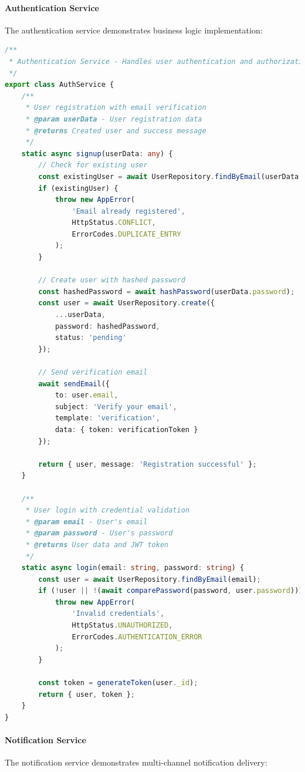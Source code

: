 \paragraph{Authentication Service}
The authentication service demonstrates business logic implementation:

\begin{lstlisting}[language=TypeScript, caption={Authentication Service Implementation}]
/**
 * Authentication Service - Handles user authentication and authorization
 */
export class AuthService {
    /**
     * User registration with email verification
     * @param userData - User registration data
     * @returns Created user and success message
     */
    static async signup(userData: any) {
        // Check for existing user
        const existingUser = await UserRepository.findByEmail(userData.email);
        if (existingUser) {
            throw new AppError(
                'Email already registered',
                HttpStatus.CONFLICT,
                ErrorCodes.DUPLICATE_ENTRY
            );
        }

        // Create user with hashed password
        const hashedPassword = await hashPassword(userData.password);
        const user = await UserRepository.create({
            ...userData,
            password: hashedPassword,
            status: 'pending'
        });

        // Send verification email
        await sendEmail({
            to: user.email,
            subject: 'Verify your email',
            template: 'verification',
            data: { token: verificationToken }
        });

        return { user, message: 'Registration successful' };
    }

    /**
     * User login with credential validation
     * @param email - User's email
     * @param password - User's password
     * @returns User data and JWT token
     */
    static async login(email: string, password: string) {
        const user = await UserRepository.findByEmail(email);
        if (!user || !(await comparePassword(password, user.password))) {
            throw new AppError(
                'Invalid credentials',
                HttpStatus.UNAUTHORIZED,
                ErrorCodes.AUTHENTICATION_ERROR
            );
        }

        const token = generateToken(user._id);
        return { user, token };
    }
}
\end{lstlisting}

\paragraph{Notification Service}
The notification service demonstrates multi-channel notification delivery:

